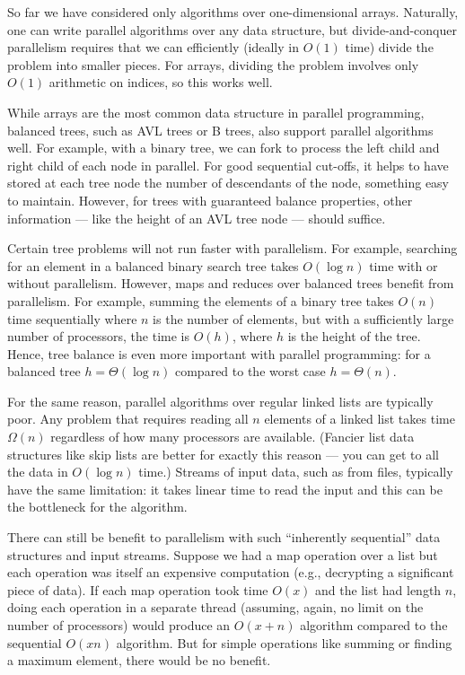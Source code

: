 \documentclass[10pt]{article}
\begin{document}
So far we have considered only algorithms over one-dimensional arrays.
Naturally, one can write parallel algorithms over any data structure,
but divide-and-conquer parallelism requires that we can efficiently
(ideally in $O(1)$ time) divide the problem into smaller pieces.  For
arrays, dividing the problem involves only $O(1)$ arithmetic on
indices, so this works well.  

While arrays are the most common data structure in parallel
programming, balanced trees, such as AVL trees or B trees, also
support parallel algorithms well.  For example, with a binary tree, we
can fork to process the left child and right child of each node in
parallel.  For good sequential cut-offs, it helps to have stored at
each tree node the number of descendants of the node, something easy
to maintain.  However, for trees with guaranteed balance properties,
other information --- like the height of an AVL tree node --- should
suffice.

Certain tree problems will not run faster with parallelism.  For
example, searching for an element in a balanced binary search tree
takes $O(\log n)$ time with or without parallelism.  However, maps and
reduces over balanced trees benefit from parallelism.  For example,
summing the elements of a binary tree takes $O(n)$ time sequentially
where $n$ is the number of elements, but with a sufficiently large number of
processors, the time is $O(h)$, where $h$ is the height of the tree.
Hence, tree balance is even more important with parallel programming:
for a balanced tree $h=\Theta(\log n)$ compared to the worst case
$h=\Theta(n)$.

For the same reason, parallel algorithms over regular linked lists are
typically poor.  Any problem that requires reading all $n$ elements of
a linked list takes time $\Omega(n)$ regardless of how many processors
are available.  (Fancier list data structures like skip lists are
better for exactly this reason --- you can get to all the data in
$O(\log n)$ time.)  Streams of input data, such as from files,
typically have the same limitation: it takes linear time to read the
input and this can be the bottleneck for the algorithm.

There can still be benefit to parallelism with such ``inherently
sequential'' data structures and input streams.  Suppose we had a map
operation over a list but each operation was itself an expensive
computation (e.g., decrypting a significant piece of data).  If each
map operation took time $O(x)$ and the list had length $n$, doing each
operation in a separate thread (assuming, again, no limit on the
number of processors) would produce an $O(x+n)$ algorithm compared to
the sequential $O(xn)$ algorithm.  But for simple operations like
summing or finding a maximum element, there would be no benefit.
\end{document}
